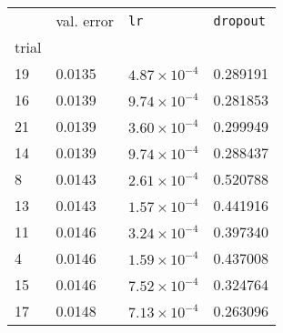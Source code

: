 \begin{tabular}{lp{2.3cm}p{2.3cm}p{2.3cm}}
\toprule
{} &  val. error &         \texttt{lr} &  \texttt{dropout} \\
trial &             &                     &                   \\
\midrule
19    &      0.0135 & $4.87\times10^{-4}$ &          0.289191 \\
16    &      0.0139 & $9.74\times10^{-4}$ &          0.281853 \\
21    &      0.0139 & $3.60\times10^{-4}$ &          0.299949 \\
14    &      0.0139 & $9.74\times10^{-4}$ &          0.288437 \\
8     &      0.0143 & $2.61\times10^{-4}$ &          0.520788 \\
13    &      0.0143 & $1.57\times10^{-4}$ &          0.441916 \\
11    &      0.0146 & $3.24\times10^{-4}$ &          0.397340 \\
4     &      0.0146 & $1.59\times10^{-4}$ &          0.437008 \\
15    &      0.0146 & $7.52\times10^{-4}$ &          0.324764 \\
17    &      0.0148 & $7.13\times10^{-4}$ &          0.263096 \\
\bottomrule
\end{tabular}
